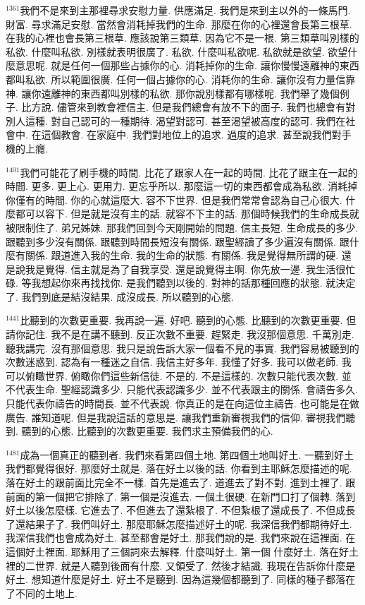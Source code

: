 \documentclass{book}
\begin{document}
$^{1361}$我們不是來到主那裡尋求安慰力量.
供應滿足.
我們是來到主以外的一條馬門.
財富.
尋求滿足安慰.
當然會消耗掉我們的生命.
那麼在你的心裡還會長第三根草.
在我的心裡也會長第三根草.
應該說第三類草.
因為它不是一根.
第三類草叫別樣的私欲.
什麼叫私欲.
別樣就表明很廣了.
私欲.
什麼叫私欲呢.
私欲就是欲望.
欲望什麼意思呢.
就是任何一個那些占據你的心.
消耗掉你的生命.
讓你慢慢遠離神的東西都叫私欲.
所以範圍很廣.
任何一個占據你的心.
消耗你的生命.
讓你沒有力量信靠神.
讓你遠離神的東西都叫別樣的私欲.
那你說別樣都有哪樣呢.
我們舉了幾個例子.
比方說.
儘管來到教會裡信主.
但是我們總會有放不下的面子.
我們也總會有對別人這種.
對自己認可的一種期待.
渴望對認可.
甚至渴望被高度的認可.
我們在社會中.
在這個教會.
在家庭中.
我們對地位上的追求.
過度的追求.
甚至說我們對手機的上癮.

$^{1401}$我們可能花了刷手機的時間.
比花了跟家人在一起的時間.
比花了跟主在一起的時間.
更多.
更上心.
更用力.
更忘乎所以.
那麼這一切的東西都會成為私欲.
消耗掉你僅有的時間.
你的心就這麼大.
容不下世界.
但是我們常常會認為自己心很大.
什麼都可以容下.
但是就是沒有主的話.
就容不下主的話.
那個時候我們的生命成長就被限制住了.
弟兄姊妹.
那我們回到今天剛開始的問題.
信主長短.
生命成長的多少.
跟聽到多少沒有關係.
跟聽到時間長短沒有關係.
跟聖經讀了多少遍沒有關係.
跟什麼有關係.
跟道進入我的生命.
我的生命的狀態.
有關係.
我是覺得無所謂的硬.
還是說我是覺得.
信主就是為了自我享受.
還是說覺得主啊.
你先放一邊.
我生活很忙碌.
等我想起你來再找找你.
是我們聽到以後的.
對神的話那種回應的狀態.
就決定了.
我們到底是結沒結果.
成沒成長.
所以聽到的心態.

$^{1441}$比聽到的次數更重要.
我再說一遍.
好吧.
聽到的心態.
比聽到的次數更重要.
但請你記住.
我不是在講不聽到.
反正次數不重要.
趕緊走.
我沒那個意思.
千萬別走.
聽我講完.
沒有那個意思.
我只是說告訴大家一個看不見的事實.
我們容易被聽到的次數迷惑到.
認為有一種迷之自信.
我信主好多年.
我懂了好多.
我可以做老師.
我可以俯瞰世界.
俯瞰你們這些新信徒.
不是的.
不是這樣的.
次數只能代表次數.
並不代表生命.
聖經認識多少.
只能代表認識多少.
並不代表跟主的關係.
會禱告多久.
只能代表你禱告的時間長.
並不代表說.
你真正的是在向這位主禱告.
也可能是在做廣告.
誰知道呢.
但是我說這話的意思是.
讓我們重新審視我們的信仰.
審視我們聽到.
聽到的心態.
比聽到的次數更重要.
我們求主預備我們的心.

$^{1481}$成為一個真正的聽到者.
我們來看第四個土地.
第四個土地叫好土.
一聽到好土我們都覺得很好.
那麼好土就是.
落在好土以後的話.
你看到主耶穌怎麼描述的呢.
落在好土的跟前面比完全不一樣.
首先是進去了.
道進去了對不對.
進到土裡了.
跟前面的第一個把它排除了.
第一個是沒進去.
一個土很硬.
在新門口打了個轉.
落到好土以後怎麼樣.
它進去了.
不但進去了還紮根了.
不但紮根了還成長了.
不但成長了還結果子了.
我們叫好土.
那麼耶穌怎麼描述好土的呢.
我深信我們都期待好土.
我深信我們也會成為好土.
甚至都會是好土.
那我們說的是.
我們來說在這裡面.
在這個好土裡面.
耶穌用了三個詞來去解釋.
什麼叫好土.
第一個 什麼好土.
落在好土裡的二世界.
就是人聽到後面有什麼.
又領受了.
然後才結識.
我現在告訴你什麼是好土.
想知道什麼是好土.
好土不是聽到.
因為這幾個都聽到了.
同樣的種子都落在了不同的土地上.
\end{document}
